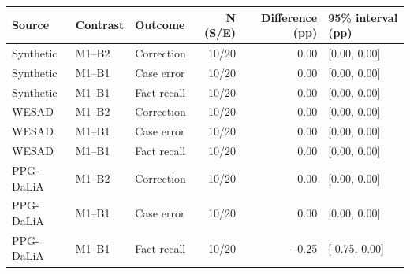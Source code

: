 \begin{tabular}{lllrrl}
\toprule
Source & Contrast & Outcome & N (S/E) & Difference (pp) & 95\% interval (pp) \\
\midrule
Synthetic & M1--B2 & Correction & 10/20 & 0.00 & [0.00, 0.00] \\
Synthetic & M1--B1 & Case error & 10/20 & 0.00 & [0.00, 0.00] \\
Synthetic & M1--B1 & Fact recall & 10/20 & 0.00 & [0.00, 0.00] \\
WESAD & M1--B2 & Correction & 10/20 & 0.00 & [0.00, 0.00] \\
WESAD & M1--B1 & Case error & 10/20 & 0.00 & [0.00, 0.00] \\
WESAD & M1--B1 & Fact recall & 10/20 & 0.00 & [0.00, 0.00] \\
PPG-DaLiA & M1--B2 & Correction & 10/20 & 0.00 & [0.00, 0.00] \\
PPG-DaLiA & M1--B1 & Case error & 10/20 & 0.00 & [0.00, 0.00] \\
PPG-DaLiA & M1--B1 & Fact recall & 10/20 & -0.25 & [-0.75, 0.00] \\
\bottomrule
\end{tabular}
